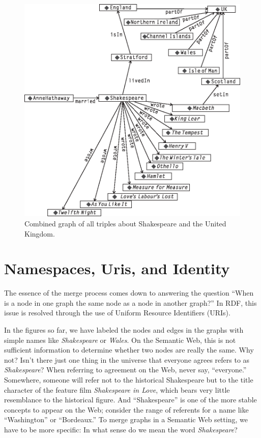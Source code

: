 \begin{figure}
    \centering
    \includegraphics[width=5.0in]{media/ch3/f03-06-9780123859655.eps}
    \caption{Combined graph of all triples about Shakespeare and the United Kingdom.}
    \label{fig:ch3.6}
\end{figure}



\section{Namespaces, Uris, and Identity}

The essence of the merge process comes down to answering the question ``When is
a node in one graph the same node as a node in another graph?'' In RDF,
this issue is resolved through the use of Uniform Resource Identifiers
(URIs).

In the figures so far, we have labeled the nodes and edges in the graphs
with simple names like \emph{Shakespeare} or \emph{Wales}. On the Semantic Web, this
is not sufficient information to determine whether two nodes are really
the same. Why not? Isn't there just one thing in the universe that
everyone agrees refers to as \emph{Shakespeare}? When referring to agreement on
the Web, never say, ``everyone.'' Somewhere, someone will refer not to
the historical Shakespeare but to the title character of the feature
film \emph{Shakespeare in Love}, which bears very little resemblance to
the historical figure. And ``Shakespeare'' is one of the more stable
concepts to appear on the Web; consider the range of referents for a
name like ``Washington'' or ``Bordeaux.'' To merge graphs in a Semantic
Web setting, we have to be more specific: In what sense do we mean the
word \emph{Shakespeare}?


